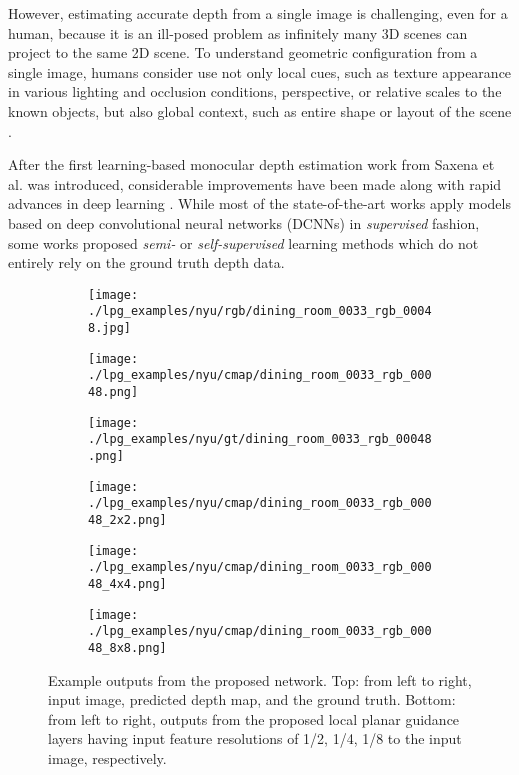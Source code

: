 \documentclass[10pt,twocolumn,letterpaper]{article}
\begin{document}
However, estimating accurate depth from a single image is challenging, even for a human, because it is an ill-posed problem as infinitely many 3D scenes can project to the same 2D scene.
To understand geometric configuration from a single image, humans consider use not only local cues, such as texture appearance in various lighting and occlusion conditions, perspective, or relative scales to the known objects, but also global context, such as entire shape or layout of the scene \cite{howard2012perceiving}.

After the first learning-based monocular depth estimation work from Saxena et al. \cite{saxena2006learning} was introduced, considerable improvements have been made along with rapid advances in deep learning \cite{eigen2014depth,eigen2015predicting,li2017two,liu2016learning,wang2015towards,roy2016monocular,kim2016unified,laina2016deeper}.
While most of the state-of-the-art works apply models based on deep convolutional neural networks (DCNNs) in \textit{supervised} fashion, some works proposed \textit{semi-} \cite{kuznietsov2017semi} or \textit{self-supervised} learning methods which do not entirely rely on the ground truth depth data.

\begin{figure}
	\centering
	\smallskip
	\begin{subfigure}{.3\linewidth}
		\centering
		\texttt{[image: ./lpg\_examples/nyu/rgb/dining\_room\_0033\_rgb\_00048.jpg]}
	\end{subfigure}
	\begin{subfigure}{.3\linewidth}
		\centering
		\texttt{[image: ./lpg\_examples/nyu/cmap/dining\_room\_0033\_rgb\_00048.png]}
	\end{subfigure}
	\begin{subfigure}{.3\linewidth}
		\centering
		\texttt{[image: ./lpg\_examples/nyu/gt/dining\_room\_0033\_rgb\_00048.png]}
	\end{subfigure}	
	
	\vspace{0.1cm}
	
	\begin{subfigure}{.3\linewidth}
		\centering
		\texttt{[image: ./lpg\_examples/nyu/cmap/dining\_room\_0033\_rgb\_00048\_2x2.png]}
	\end{subfigure}
	\begin{subfigure}{.3\linewidth}
		\centering
		\texttt{[image: ./lpg\_examples/nyu/cmap/dining\_room\_0033\_rgb\_00048\_4x4.png]}
	\end{subfigure}
	\begin{subfigure}{.3\linewidth}
		\centering
		\texttt{[image: ./lpg\_examples/nyu/cmap/dining\_room\_0033\_rgb\_00048\_8x8.png]}
	\end{subfigure}
	\caption{Example outputs from the proposed network. Top: from left to right, input image, predicted depth map, and the ground truth. Bottom: from left to right, outputs from the proposed local planar guidance layers having input feature resolutions of 1/2, 1/4, 1/8 to the input image, respectively.}
	\label{fg:mde_example}
\end{figure}
\end{document}
